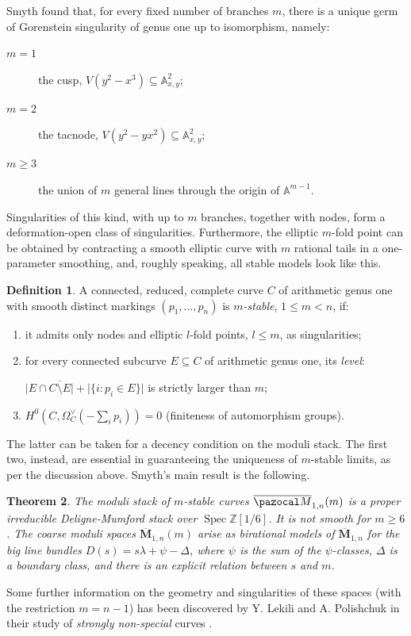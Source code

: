\documentclass[11pt]{amsart}
\newcommand{\Aaff}{\mathbb A}
\newcommand{\oM}{\overline{\pazocal M}}
\theoremstyle{plain}
\newtheorem{thm}{Theorem}[section]
\theoremstyle{definition}
\newtheorem{dfn}[thm]{Definition}
\begin{document}
Smyth found that, for every fixed number of branches $m$, there is a unique germ of Gorenstein singularity of genus one up to isomorphism, namely:
\begin{description}
 \item[$m=1$] the cusp, $V(y^2-x^3)\subseteq\Aaff^2_{x,y}$;
 \item[$m=2$] the tacnode, $V(y^2-yx^2)\subseteq\Aaff^2_{x,y}$;
 \item[$m\geq 3$] the union of $m$ general lines through the origin of $\Aaff^{m-1}$.
\end{description}
Singularities of this kind, with up to $m$ branches, together with nodes, form a deformation-open class of singularities. Furthermore, the elliptic $m$-fold point can be obtained by contracting a smooth elliptic curve with $m$ rational tails in a one-parameter smoothing, and, roughly speaking, all stable models look like this.
\begin{dfn}\cite{SMY1}
 A connected, reduced, complete curve $C$ of arithmetic genus one with smooth distinct markings $(p_1,\ldots,p_n)$ is \emph{$m$-stable}, $1\leq m<n$, if:
 \begin{enumerate}[leftmargin=0.7cm]
  \item it admits only nodes and elliptic $l$-fold points, $l\leq m$, as singularities;
  \item for every connected subcurve $E\subseteq C$ of arithmetic genus one, its \emph{level}:
  
  \noindent$\lvert E\cap\overline{C\setminus E}\rvert+\lvert\{i\colon p_i\in E\}\rvert$ is strictly larger than $m$;
  \item $H^0(C,\Omega_C^\vee(-\sum_i p_i))=0$ (finiteness of automorphism groups).
 \end{enumerate}
\end{dfn}
The latter can be taken for a decency condition on the moduli stack. The first two, instead, are essential in guaranteeing the uniqueness of $m$-stable limits, as per the discussion above. Smyth's main result is the following.
\begin{thm}\cite{SMY1,SMY2}
 The moduli stack of $m$-stable curves $\oM_{1,n}(m)$ is a proper irreducible Deligne-Mumford stack over $\operatorname{Spec}\mathbb Z[1/6]$. It is \emph{not} smooth for $m\geq 6$. The coarse moduli spaces $\overline{\mathbf{M}}_{1,n}(m)$ arise as birational models of $\overline{\mathbf{M}}_{1,n}$ for the big line bundles $D(s)=s\lambda+\psi-\Delta$, where $\psi$ is the sum of the $\psi$-classes, $\Delta$ is a boundary class, and there is an explicit relation between $s$ and $m$.
\end{thm}
Some further information on the geometry and singularities of these spaces (with the restriction $m=n-1$) has been discovered by Y. Lekili and A. Polishchuk in their study of \emph{strongly non-special} curves \cite{Lekili-Polishchuk}.
\end{document}
